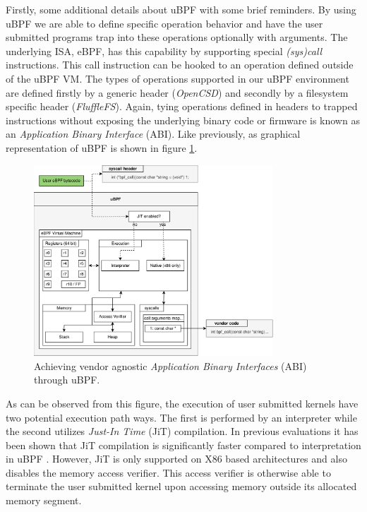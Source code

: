 Firstly, some additional details about uBPF with some brief reminders. By using
uBPF we are able to define specific operation behavior and have the user
submitted programs trap into these operations optionally with arguments. The
underlying ISA, eBPF, has this capability by supporting special
\textit{(sys)call} instructions. This call instruction can be hooked to an
operation defined outside of the uBPF VM. The types of operations supported in
our uBPF environment are defined firstly by a generic header (\textit{OpenCSD})
and secondly by a filesystem specific header (\textit{FluffleFS}). Again, tying
operations defined in headers to trapped instructions without exposing the
underlying binary code or firmware is known as an
\textit{Application Binary Interface} (ABI). Like previously, as graphical
representation of uBPF is shown in figure \ref{figure:ubpf-abi2}.

\begin{figure}
    \centering
	\includegraphics[width=0.8\textwidth]{resources/images/ubpf-abi.pdf}
	\caption{Achieving vendor agnostic \textit{Application Binary Interfaces}
        (ABI) through uBPF.}
    \label{figure:ubpf-abi2}
\end{figure}

As can be observed from this figure, the execution of user submitted kernels
have two potential execution path ways. The first is performed by an interpreter
while the second utilizes \textit{Just-In Time} (JiT) compilation. In previous
evaluations it has been shown that JiT compilation is significantly faster
compared to interpretation in uBPF \cite{lukken2021zcsd}. However, JiT is only
supported on X86 based architectures and also disables the memory access
verifier. This access verifier is otherwise able to terminate the user submitted
kernel upon accessing memory outside its allocated memory segment.

